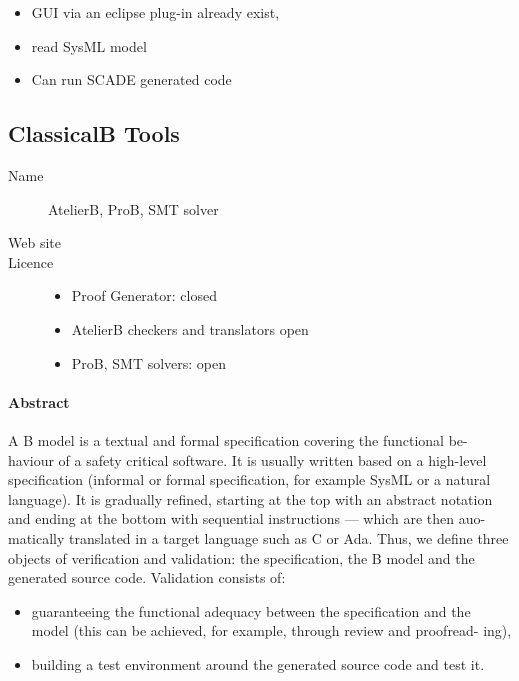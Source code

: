 \begin{itemize}
  \item GUI via an eclipse plug-in already exist,
  \item read SysML model
  \item Can run SCADE generated code
\end{itemize}

\subsection{ClassicalB Tools}
\label{sec:ClassicalB}

\begin{description}
\item[Name] AtelierB, ProB, SMT solver
\item[Web site] 
\item[Licence] 
  \begin{itemize}
    \item Proof Generator:  closed
    \item AtelierB checkers and translators open
    \item ProB, SMT solvers: open
  \end{itemize}
\end{description}

\paragraph{Abstract}

A B model is a textual and formal specification covering the functional be-
haviour of a safety critical software. It is usually written based on a high-level
specification (informal or formal specification, for example SysML or a natural
language). It is gradually refined, starting at the top with an abstract notation
and ending at the bottom with sequential instructions — which are then auo-
matically translated in a target language such as C or Ada.
Thus, we define three objects of verification and validation: the specification,
the B model and the generated source code.
Validation consists of:
\begin{itemize}

\item guaranteeing the functional adequacy between the specification and the
model (this can be achieved, for example, through review and proofread-
ing),
\item building a test environment around the generated source code and test it.

\end{itemize}

